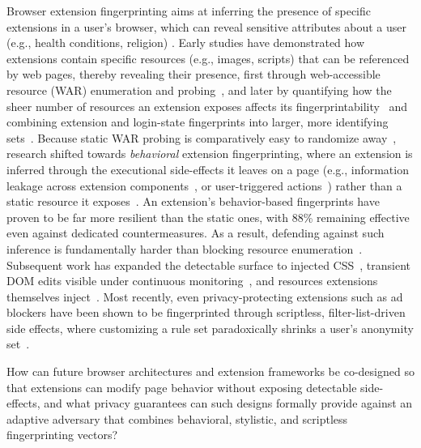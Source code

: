 Browser extension fingerprinting aims at inferring the presence of specific extensions in a user's browser, which can reveal sensitive
attributes about a user (e.g., health conditions, religion) \cite{karamiCarnusExploringPrivacy2020}.
%
Early studies have demonstrated how extensions contain specific resources (e.g., images, scripts) that can be referenced by web pages, thereby revealing their presence, first through web-accessible resource (WAR) enumeration and probing~\cite{starovXHOUNDQuantifyingFingerprintability2017,starovExtendedTrackingPowers2017}, and later by quantifying how the sheer number of resources an extension exposes affects its fingerprintability~\cite{starovUnnecessarilyIdentifiableQuantifying2019} and combining extension and login-state fingerprints into larger, more identifying sets~\cite{laperdrixBeautyBeastDiverting2016}.
%
Because static WAR probing is comparatively easy to randomize away~\cite{trickelEveryoneDifferentClientside2019}, research shifted towards \textit{behavioral} extension fingerprinting, where an extension is inferred through the executional side-effects it leaves on a page (e.g., information leakage across extension components~\cite{chenMystiqueUncoveringInformation2018}, or user-triggered actions~\cite{solomosDangersHumanTouch2022}) rather than a static resource it exposes~\cite{karamiCarnusExploringPrivacy2020,laperdrixFingerprintingStyleDetecting2021,solomosEscapingConfinesTime2022}.
%
An extension's behavior-based fingerprints have proven to be far more resilient than the static ones, with 88\% remaining effective even against dedicated countermeasures. 
%
As a result, defending against such inference is fundamentally harder than blocking resource enumeration~\cite{karamiCarnusExploringPrivacy2020}.
%
Subsequent work has expanded the detectable surface to injected CSS~\cite{laperdrixFingerprintingStyleDetecting2021}, transient DOM edits visible under continuous monitoring~\cite{solomosEscapingConfinesTime2022}, and resources extensions themselves inject~\cite{xieArcanumDetectingEvaluating2024}.
%
Most recently, even privacy-protecting extensions such as ad blockers have been shown to be fingerprinted through scriptless, filter-list-driven side effects, where customizing a rule set paradoxically shrinks a user's anonymity set~\cite{chehade2025double}.

\begin{opbox}
How can future browser architectures and extension frameworks be co-designed so that extensions can modify page behavior without exposing detectable side-effects, and what privacy guarantees can such designs formally provide against an adaptive adversary that combines behavioral, stylistic, and scriptless fingerprinting vectors?
\end{opbox}


